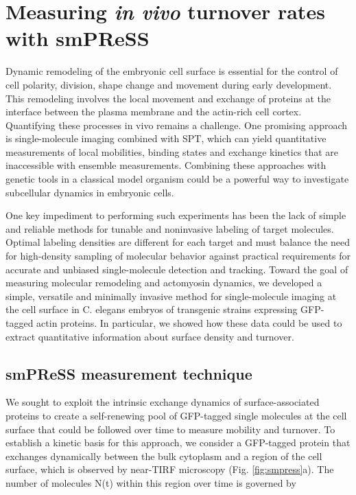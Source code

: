 \section{Measuring \textit{in vivo} turnover rates with smPReSS}

Dynamic remodeling of the embryonic cell surface is essential for the control of cell polarity, division, shape change and movement during early development. This remodeling involves the local movement and exchange of proteins at the interface between the plasma membrane and the actin-rich cell cortex. Quantifying these processes in vivo remains a challenge. One promising approach is single-molecule imaging combined with SPT, which can yield quantitative measurements of local mobilities, binding states and exchange kinetics that are inaccessible with ensemble measurements\cite{doi:10.1021/ac9024889}. Combining these approaches with genetic tools in a classical model organism could be a powerful way to investigate subcellular dynamics in embryonic cells.

One key impediment to performing such experiments has been the lack of simple and reliable methods for tunable and noninvasive labeling of target molecules. Optimal labeling densities are different for each target and must balance the need for high-density sampling of molecular behavior against practical requirements for accurate and unbiased single-molecule detection and tracking. Toward the goal of measuring molecular remodeling and actomyosin dynamics, we developed a simple, versatile and minimally invasive method\cite{nmeth} for single-molecule imaging at the cell surface in C. elegans embryos of transgenic strains expressing GFP-tagged actin proteins. In particular, we showed how these data could be used to extract quantitative information about surface density and turnover.


\subsection{smPReSS measurement technique}



We sought to exploit the intrinsic exchange dynamics of surface-associated proteins to create a self-renewing pool of GFP-tagged single molecules at the cell surface that could be followed over time to measure mobility and turnover. To establish a kinetic basis for this approach, we consider a GFP-tagged protein that exchanges dynamically between the bulk cytoplasm and a region of the cell surface, which is observed by near-TIRF microscopy (Fig. \ref{fig:smpress}a). The number of molecules N(t) within this region over time is governed by


